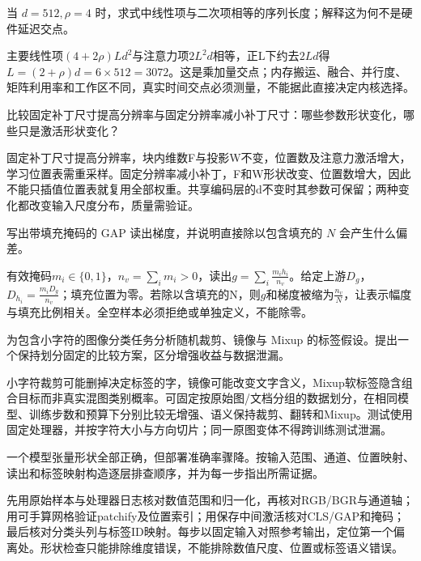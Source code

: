 \begin{exercises}
\begin{exercise} 当 $d=512,\rho=4$ 时，求式中线性项与二次项相等的序列长度；解释这为何不是硬件延迟交点。

\begin{solution}
主要线性项$(4+2\rho)Ld^2$与注意力项$2L^2d$相等，正L下约去$2Ld$得$L=(2+\rho)d=6\times512=3072$。这是乘加量交点；内存搬运、融合、并行度、矩阵利用率和工作区不同，真实时间交点必须测量，不能据此直接决定内核选择。
\end{solution}
\end{exercise}

\begin{exercise} 比较固定补丁尺寸提高分辨率与固定分辨率减小补丁尺寸：哪些参数形状变化，哪些只是激活形状变化？

\begin{solution}
固定补丁尺寸提高分辨率，块内维数F与投影W不变，位置数及注意力激活增大，学习位置表需重采样。固定分辨率减小补丁，F和W形状改变、位置数增大，因此不能只插值位置表就复用全部权重。共享编码层的d不变时其参数可保留；两种变化都改变输入尺度分布，质量需验证。
\end{solution}
\end{exercise}

\begin{exercise} 写出带填充掩码的 GAP 读出梯度，并说明直接除以包含填充的 $N$ 会产生什么偏差。

\begin{solution}
有效掩码$m_i\in\{0,1\}$，$n_v=\sum_i m_i>0$，读出$g=\sum_i \frac{m_ih_i}{n_v}$。给定上游$D_g$，$D_{h_i}=\frac{m_iD_g}{n_v}$；填充位置为零。若除以含填充的N，则$g$和梯度被缩为$\frac{n_v}{N}$，让表示幅度与填充比例相关。全空样本必须拒绝或单独定义，不能除零。
\end{solution}
\end{exercise}

\begin{exercise} 为包含小字符的图像分类任务分析随机裁剪、镜像与 Mixup 的标签假设。提出一个保持划分固定的比较方案，区分增强收益与数据泄漏。

\begin{solution}
小字符裁剪可能删掉决定标签的字，镜像可能改变文字含义，Mixup软标签隐含组合目标而非真实混图类别概率。可固定按原始图/文档分组的数据划分，在相同模型、训练步数和预算下分别比较无增强、语义保持裁剪、翻转和Mixup。测试使用固定处理器，并按字符大小与方向切片；同一原图变体不得跨训练测试泄漏。
\end{solution}
\end{exercise}

\begin{exercise} 一个模型张量形状全部正确，但部署准确率骤降。按输入范围、通道、位置映射、读出和标签映射构造逐层排查顺序，并为每一步指出所需证据。

\begin{solution}
先用原始样本与处理器日志核对数值范围和归一化，再核对RGB/BGR与通道轴；用可手算网格验证patchify及位置索引；用保存中间激活核对CLS/GAP和掩码；最后核对分类头列与标签ID映射。每步以固定输入对照参考输出，定位第一个偏离处。形状检查只能排除维度错误，不能排除数值尺度、位置或标签语义错误。
\end{solution}
\end{exercise}

\end{exercises}
